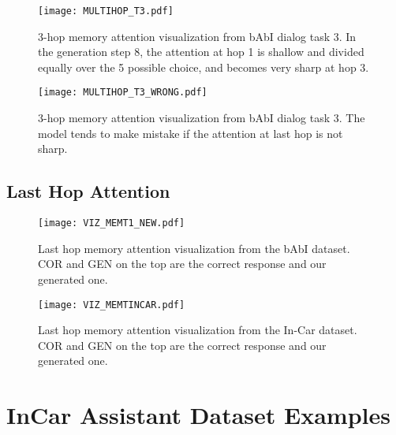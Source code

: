 \documentclass[11pt,a4paper]{article}
\begin{document}
\begin{figure}[H]
\centering
\texttt{[image: MULTIHOP\_T3.pdf]}
\caption{3-hop memory attention visualization from bAbI dialog task 3. In the generation step 8, the attention at hop 1 is shallow and divided equally over the 5 possible choice, and becomes very sharp at hop 3.}
\label{3hop}
\end{figure}

\begin{figure}[H]
\centering
\texttt{[image: MULTIHOP\_T3\_WRONG.pdf]}
\caption{3-hop memory attention visualization from bAbI dialog task 3. The model tends to make mistake if the attention at last hop is not sharp.}
\label{3hopWRONG}
\end{figure}

\subsection{Last Hop Attention}
\begin{figure}[H]
\centering
\texttt{[image: VIZ\_MEMT1\_NEW.pdf]}\caption{Last hop memory attention visualization from the bAbI dataset. COR and GEN on the top are the correct response and our generated one.}
\label{MEMATT}
\end{figure}


\begin{figure}[H]
\centering
\texttt{[image: VIZ\_MEMTINCAR.pdf]}\caption{Last hop memory attention visualization from the In-Car dataset. COR and GEN on the top are the correct response and our generated one.}
\label{MEMATT}
\end{figure}





\section{InCar Assistant Dataset Examples}
\end{document}
